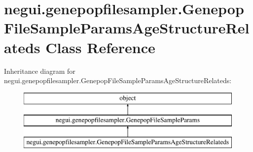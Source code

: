 \hypertarget{classnegui_1_1genepopfilesampler_1_1GenepopFileSampleParamsAgeStructureRelateds}{}\section{negui.\+genepopfilesampler.\+Genepop\+File\+Sample\+Params\+Age\+Structure\+Relateds Class Reference}
\label{classnegui_1_1genepopfilesampler_1_1GenepopFileSampleParamsAgeStructureRelateds}
Inheritance diagram for negui.\+genepopfilesampler.\+Genepop\+File\+Sample\+Params\+Age\+Structure\+Relateds\+:\begin{figure}[H]
\begin{center}
\leavevmode
\includegraphics[height=3.000000cm]{classnegui_1_1genepopfilesampler_1_1GenepopFileSampleParamsAgeStructureRelateds}
\end{center}
\end{figure}
